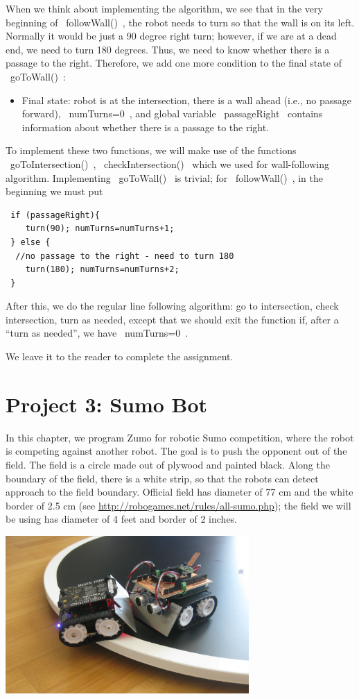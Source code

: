 \documentclass[oneside]{stml-l}
\numberwithin{figure}{chapter}
\begin{document}
When we think about implementing the algorithm, we see that in the
very beginning of ~followWall()~, the robot needs to turn so that the wall
is on its left. Normally it would be just a 90 degree right  turn; however,
if we are at a dead end, we need to turn 180 degrees. Thus, we need to know
whether there is  a passage to the right. Therefore, we add one more
condition to the final state of ~goToWall()~:
\begin{itemize}
\item Final state: robot is at the intersection, there is a wall ahead
(i.e., no passage forward),  ~numTurns=0~, and global variable
~passageRight~ contains information about whether there is a passage to the right.
 \end{itemize}

 To implement these two functions, we will make use of the functions
 ~goToIntersection()~, ~checkIntersection()~ which we used for
 wall-following algorithm. Implementing ~goToWall()~ is trivial; for
 ~followWall()~, in the beginning we must put
 \begin{lstlisting}
 if (passageRight){
    turn(90); numTurns=numTurns+1;
 } else {
  //no passage to the right - need to turn 180
    turn(180); numTurns=numTurns+2;
 }
 \end{lstlisting}

 After this, we do the regular line following algorithm: go to intersection,
  check intersection, turn as needed, except that we should exit the
  function if, after a ``turn as needed'', we have  ~numTurns=0~.

 We leave it to the reader to complete the assignment.


\chapter{Project 3: Sumo Bot}
In this chapter, we program Zumo for robotic Sumo competition, where
the  robot is competing against another robot. The goal is to push the
opponent out of the field. The field is a circle   made out of plywood
and painted black. Along the boundary of the field,
there is a white strip, so that the robots can detect
approach to the field boundary. Official field has diameter of 77 cm
and the white border of 2.5 cm (see \url{http://robogames.net/rules/all-sumo.php});
the field we will be using has diameter of 4 feet and border of 2 inches.


\includegraphics[height=6cm]{figures/sumo-robot-fight.png}
\end{document}
